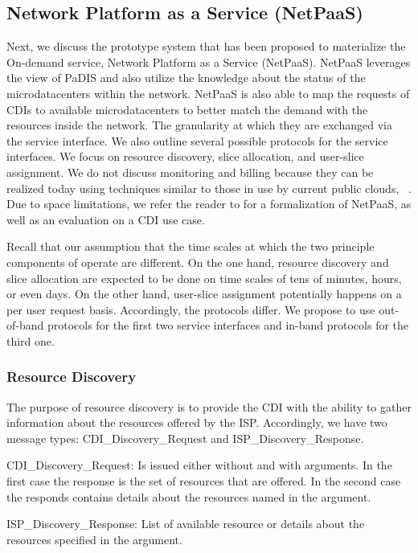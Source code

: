 \subsection{Network Platform as a Service (NetPaaS)}\label{sec:future-netpaas}

Next, we discuss the prototype system that has been proposed to materialize the
On-demand service, Network Platform as a Service (NetPaaS). NetPaaS leverages
the view of PaDIS and also utilize the knowledge about the status of the
microdatacenters within the network. NetPaaS is also able to map the requests
of CDIs to available microdatacenters to better match the demand with the
resources inside the network.  The granularity at which they are exchanged via
the service interface.  We also outline several possible protocols for the
service interfaces. We focus on resource discovery, slice allocation, and
user-slice assignment. We do not discuss monitoring and billing because they
can be realized today using techniques similar to those in use by current
public clouds, \eg~\cite{aboveclouds}. Due to space limitations, we refer the
reader to \cite{NetPaaS} for a formalization of NetPaaS, as well as an
evaluation on a CDI use case.

Recall that our assumption that the time scales at which the two principle
components of \onservice operate are different. On the one hand, resource
discovery and slice allocation are expected to be done on time scales of tens
of minutes, hours, or even days. On the other hand, user-slice assignment
potentially happens on a per user request basis. Accordingly, the protocols
differ. We propose to use out-of-band protocols for the first two service
interfaces and in-band protocols for the third one.


\subsubsection{Resource Discovery}\label{sec:Resource-Discovery}

The purpose of resource discovery is to provide the CDI with the ability to
gather information about the resources offered by the ISP. Accordingly, we
have two message types: CDI\_Discovery\_Request and ISP\_Discovery\_Re\-sponse.

\begin{description*}

\item [CDI\_Discovery\_Request:] Is issued either without and with arguments.
In the first case the response is the set of resources that are offered. In the
second case the responds contains details about the resources named in the
argument.

\item [ISP\_Discovery\_Response:] List of available resource or details about
the resources specified in the argument.

\end{description*}

